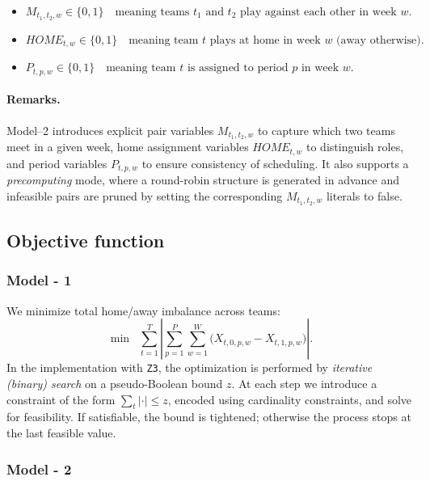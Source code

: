 \documentclass{article}
\begin{document}
\begin{itemize}
    \item  $ M_{t_1,t_2,w} \in \{0,1\} \quad\text{meaning teams $t_1$ and $t_2$ play against each other in week $w$}. $
    \item $HOME_{t,w} \in \{0,1\} \quad\text{meaning team $t$ plays at home in week $w$ (away otherwise)}.$
    \item $P_{t,p,w} \in \{0,1\} \quad\text{meaning team $t$ is assigned to period $p$ in week $w$}.$
\end{itemize}


\paragraph{Remarks.}

Model--2 introduces explicit pair variables \(M_{t_1,t_2,w}\) to capture
which two teams meet in a given week, home assignment variables
\(HOME_{t,w}\) to distinguish roles, and period variables
\(P_{t,p,w}\) to ensure consistency of scheduling. It also supports
a \emph{precomputing} mode, where a round-robin structure is generated
in advance and infeasible pairs are pruned by setting the corresponding
\(M_{t_1,t_2,w}\) literals to false.


\subsection{Objective function}

\subsubsection{Model - 1}

We minimize total home/away imbalance across teams:
\[
\min \;\; \sum_{t=1}^{T} \left| 
\sum_{p=1}^{P}\sum_{w=1}^{W} \big( X_{t,0,p,w} - X_{t,1,p,w} \big)
\right|.
\]
In the implementation with \texttt{Z3}, the optimization is performed by 
\emph{iterative (binary) search} on a pseudo-Boolean bound \(z\). 
At each step we introduce a constraint of the form 
\(\sum_t \lvert \cdot \rvert \leq z\), encoded using cardinality 
constraints, and solve for feasibility. If satisfiable, the bound 
is tightened; otherwise the process stops at the last feasible value.

\subsubsection{Model - 2 }
\end{document}
